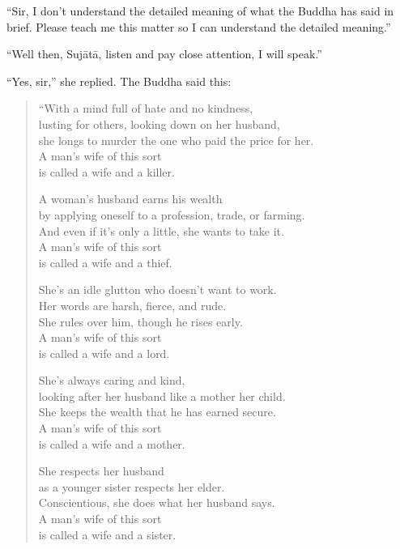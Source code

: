 \documentclass[12pt,openany]{book}%
\begin{document}
“Sir, I don’t understand the detailed meaning of what the Buddha has said in brief. Please teach me this matter so I can understand the detailed meaning.” 

“Well then, \textsanskrit{Sujātā}, listen and pay close attention, I will speak.” 

“Yes, sir,” she replied. The Buddha said this: 

\begin{verse}%
“With a mind full of hate and no kindness, \\
lusting for others, looking down on her husband, \\
she longs to murder the one who paid the price for her. \\
A man’s wife of this sort \\
is called a wife and a killer. 

A woman’s husband earns his wealth \\
by applying oneself to a profession, trade, or farming. \\
And even if it’s only a little, she wants to take it. \\
A man’s wife of this sort \\
is called a wife and a thief. 

She’s an idle glutton who doesn’t want to work. \\
Her words are harsh, fierce, and rude. \\
She rules over him, though he rises early. \\
A man’s wife of this sort \\
is called a wife and a lord. 

She’s always caring and kind, \\
looking after her husband like a mother her child. \\
She keeps the wealth that he has earned secure. \\
A man’s wife of this sort \\
is called a wife and a mother. 

She respects her husband \\
as a younger sister respects her elder. \\
Conscientious, she does what her husband says. \\
A man’s wife of this sort \\
is called a wife and a sister. 


\end{verse}
\end{document}
